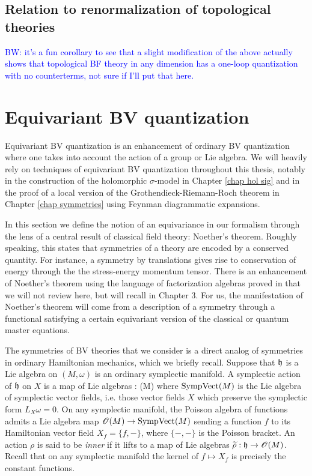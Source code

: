 \documentclass[10pt]{amsart}
\def\brian{\textcolor{blue}{BW: }\textcolor{blue}}
\begin{document}
\subsection{Relation to renormalization of topological theories}

\brian{it's a fun corollary to see that a slight modification of the above actually shows that topological BF theory in any dimension has a one-loop quantization with no counterterms, not sure if I'll put that here.}

\section{Equivariant BV quantization}

Equivariant BV quantization is an enhancement of ordinary BV quantization where one takes into account the action of a group or Lie algebra. 
We will heavily rely on techniques of equivariant BV quantization throughout this thesis, notably in the construction of the holomorphic $\sigma$-model in Chapter \ref{chap hol sig} and in the proof of a local version of the Grothendieck-Riemann-Roch theorem in Chapter \ref{chap symmetries} using Feynman diagrammatic expansions.

In this section we define the notion of an equivariance in our formalism through the lens of a central result of classical field theory: Noether's theorem.
Roughly speaking, this states that symmetries of a theory are encoded by a conserved quantity. 
For instance, a symmetry by translations gives rise to conservation of energy through the the stress-energy momentum tensor. 
There is an enhancement of Noether's theorem using the language of factorization algebras proved in \cite{CG2} that we will not review here, but will recall in Chapter 3. 
For us, the manifestation of Noether's theorem will come from a description of a symmetry through a functional satisfying a certain equivariant version of the classical or quantum master equations. 

The symmetries of BV theories that we consider is a direct analog of symmetries in ordinary Hamiltonian mechanics, which we briefly recall. 
Suppose that $\mathfrak h$ is a Lie algebra on $(M,\omega)$ is an ordinary symplectic manifold. 
A symplectic action of $\mathfrak h$ on $X$ is a map of Lie algebras 
\ben
\rho : \fh {}(M)
\een
where ${\rm SympVect}(M)$ is the Lie algebra of symplectic vector fields, i.e. those vector fields $X$ which preserve the symplectic form $L_X \omega = 0$.
On any symplectic manifold, the Poisson algebra of functions admits a Lie algebra map $\mathscr O(M) \to {\rm SympVect}(M)$ sending a function $f$ to its Hamiltonian vector field $X_f = \{f,-\}$, where $\{-,-\}$ is the Poisson bracket.
An action $\rho$ is said to be {\em inner} if it lifts to a map of Lie algebras $\widetilde{\rho} : \mathfrak h \to \mathscr O(M)$. 
Recall that on any symplectic manifold the kernel of $f \mapsto X_f$ is precisely the constant functions. 
\end{document}
